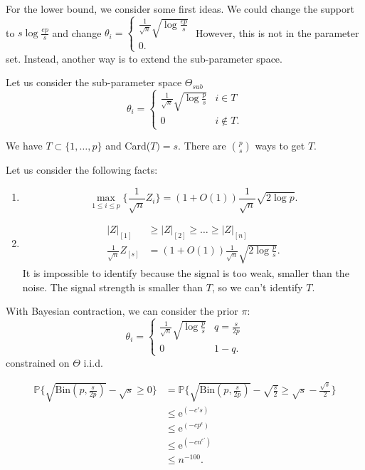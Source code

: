 \documentclass[twoside]{article}
\theoremstyle{definition}
\theoremstyle{definition}
\theoremstyle{remark}
\begin{document}
For the lower bound, we consider some first ideas. We could change the support to $s \log \frac{ep}{s}$ and change $\theta_i = \begin{cases}
\frac{1}{\sqrt{n}} \sqrt{\log \frac{ep}{s}} \\
0.
\end{cases}$ However, this is not in the parameter set. Instead, another way is to extend the sub-parameter space.

Let us consider the sub-parameter space $\Theta_{sub}$
\[
\theta_i = \begin{cases}
\frac{1}{\sqrt{n}} \sqrt{\log \frac{p}{s}} & i \in T \\
0 & i \not \in T.
\end{cases}
\]

We have $T \subset \{1, \ldots, p \}$ and Card($T) = s.$
There are ${p \choose s}$ ways to get $T$.

Let us consider the following facts:
\begin{enumerate}
\item \[
\max_{1 \leq i \leq p} \{ \frac{1}{\sqrt{n}} Z_i \} = (1 + O(1)) \frac{1}{\sqrt{n}}\sqrt{2 \log p}.
\]
\item \[
\begin{aligned}
| Z |_{[1]} &\geq | Z |_{[2]} \geq \ldots \geq | Z |_{[n]} \\
\frac{1}{\sqrt{n}}Z_{[s]} &= (1 + O(1)) \frac{1}{\sqrt{n}} \sqrt{2\log \frac{p}{s}}.
\end{aligned}
\]
It is impossible to identify because the signal is too weak, smaller than the noise. The signal strength is smaller than $T$, so we can't identify $T$.
\end{enumerate}

With Bayesian contraction, we can consider the prior $\pi$:
\[
\theta_i = \begin{cases}
\frac{1}{\sqrt{n}}\sqrt{\log \frac{p}{s}} & q=\frac{s}{2p} \\
0 & 1-q.
\end{cases}
\]
constrained on $\Theta$ i.i.d.

\[
\begin{aligned}
\mathbb{P} \Bigg\{ \sqrt{\mathrm{Bin}(p, \frac{s}{2p})} - \sqrt{s} \geq 0 \Bigg\} &= \mathbb{P} \Bigg\{ \sqrt{\mathrm{Bin}(p, \frac{s}{2p})} - \sqrt{\frac{s}{2}} \geq \sqrt{s} - \frac{\sqrt{s}}{2} \Bigg\} \\
&\leq \mathrm{e}^{(-c's)} \\
&\leq \mathrm{e}^{(-c p^\epsilon)} \\
&\leq \mathrm{e}^{(-c n^{\epsilon '})} \\
&\leq n^{-100}.
\end{aligned}
\]
\end{document}
